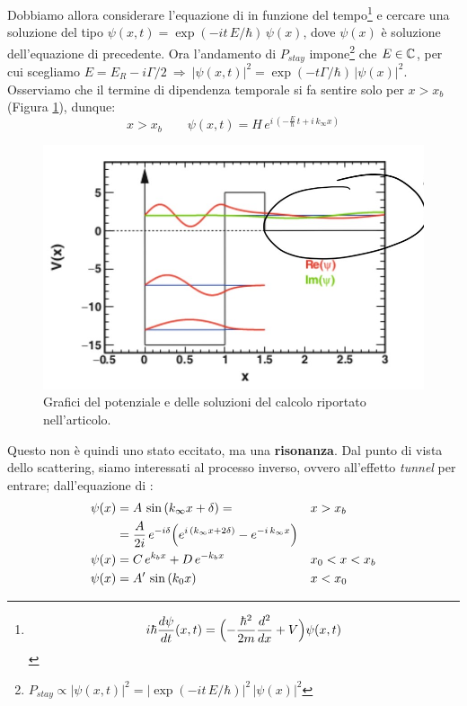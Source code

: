 \newpage
\noindent Dobbiamo allora considerare l'equazione di \Sch{} in funzione del tempo\footnote{$$i\hbar \frac{d\psi}{dt}(x,t) = \Bigl ( -\frac{\hbar^2}{2m}\frac{d^2}{dx}+V \Bigr )\psi(x,t)$$} e cercare una soluzione del tipo $\psi(x,t) = \exp{(-i t \, E/\hbar)}\,\psi(x)$, dove $\psi(x)$ è soluzione dell'equazione di \Sch{} precedente. Ora l'andamento di $P_{stay}$ impone\footnote{$P_{stay}\propto |\psi(x,t)|^2 = |\exp{(-i t \, E/\hbar)}|^2\,|\psi(x)|^2$} che $E\in \mathbb{C}$, per cui scegliamo $E = E_R - i \Gamma/2 \:\Rightarrow\: |\psi(x,t)|^2 = \exp{(-t\Gamma/\hbar)}\,|\psi(x)|^2$. Osserviamo che il termine di dipendenza temporale si fa sentire solo per $x>x_b$ (Figura \ref{0325_ris2}), dunque:
$$x>x_b \qquad \psi(x,t) = H\,e^{i\,(-\frac{E}{\hbar}\,t + i\,k_\infty x)}$$
\begin{figure}[h]
    \centering
    \includegraphics[scale=0.4]{Immagini/0325_risonanza2.png}
    \caption{Grafici del potenziale e delle soluzioni del calcolo riportato nell'articolo.}
    \label{0325_ris2}
\end{figure}
\noindent Questo non è quindi uno stato eccitato, ma una \textbf{risonanza}. Dal punto di vista dello scattering, siamo interessati al processo inverso, ovvero all'effetto \textit{tunnel} per entrare; dall'equazione di \Sch{}:
\begin{displaymath}
\begin{aligned}
\psi(x)&= A\, \sin{(k_\infty x +\delta)} = & &x>x_b \\
&= \frac{A}{2i} \, e^{-i\delta}\Bigl ( e^{i\,(k_\infty x + 2\delta)} - e^{-i\,k_\infty x} \Bigr ) & \\
\psi(x)&= C\, e^{k_b x} + D\, e^{-k_b x} & &x_0<x<x_b \\
\psi(x)&= A'\, \sin{(k_0 x)} & &x<x_0 
\end{aligned}
\end{displaymath}
